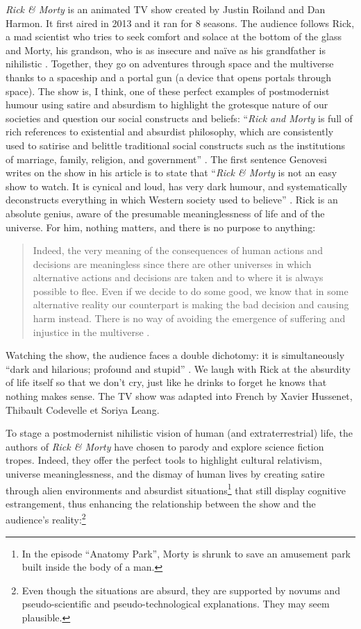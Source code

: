 \documentclass[output=paper]{langscibook}
\begin{document}
\textit{Rick \& Morty} is an animated TV show created by Justin Roiland and Dan Harmon. It first aired in 2013 and it ran for 8 seasons. The audience follows Rick, a mad scientist who tries to seek comfort and solace at the bottom of the glass and Morty, his grandson, who is as insecure and naïve as his grandfather is nihilistic \citep{Abesamis2019}. Together, they go on adventures through space and the multiverse thanks to a spaceship and a portal gun (a device that opens portals through space). The show is, I think, one of these perfect examples of postmodernist humour using satire and absurdism to highlight the grotesque nature of our societies and question our social constructs and beliefs: “\textit{Rick and Morty} is full of rich references to existential and absurdist philosophy, which are consistently used to satirise and belittle traditional social constructs such as the institutions of marriage, family, religion, and government” \citep[101]{Koltun2018}. The first sentence Genovesi writes on the show in his article is to state that “\textit{Rick \& Morty} is not an easy show to watch. It is cynical and loud, has very dark humour, and systematically deconstructs everything in which Western society used to believe” \citep[2]{Genovesi2020}. Rick is an absolute genius, aware of the presumable meaninglessness of life and of the universe. For him, nothing matters, and there is no purpose to anything:

\begin{quote}
Indeed, the very meaning of the consequences of human actions and decisions are meaningless since there are other universes in which alternative actions and decisions are taken and to where it is always possible to flee. Even if we decide to do some good, we know that in some alternative reality our counterpart is making the bad decision and causing harm instead. There is no way of avoiding the emergence of suffering and injustice in the multiverse \citep[12]{Genovesi2020}.
\end{quote}

Watching the show, the audience faces a double dichotomy: it is simultaneously “dark and hilarious; profound and stupid” \citep{Miranda2017}. We laugh with Rick at the absurdity of life itself so that we don’t cry, just like he drinks to forget he knows that nothing makes sense. The TV show was adapted into French by Xavier Hussenet, Thibault Codevelle et Soriya Leang.

To stage a postmodernist nihilistic vision of human (and extraterrestrial) life, the authors of \textit{Rick \& Morty} have chosen to parody and explore science fiction tropes. Indeed, they offer the perfect tools to highlight cultural relativism, universe meaninglessness, and the dismay of human lives by creating satire through alien environments and absurdist situations\footnote{In the episode “Anatomy Park”, Morty is shrunk to save an amusement park built inside the body of a man.} that still display cognitive estrangement, thus enhancing the relationship between the show and the audience’s reality:\footnote{Even though the situations are absurd, they are supported by novums and pseudo-scientific and pseudo-technological explanations. They may seem plausible.}
\end{document}
